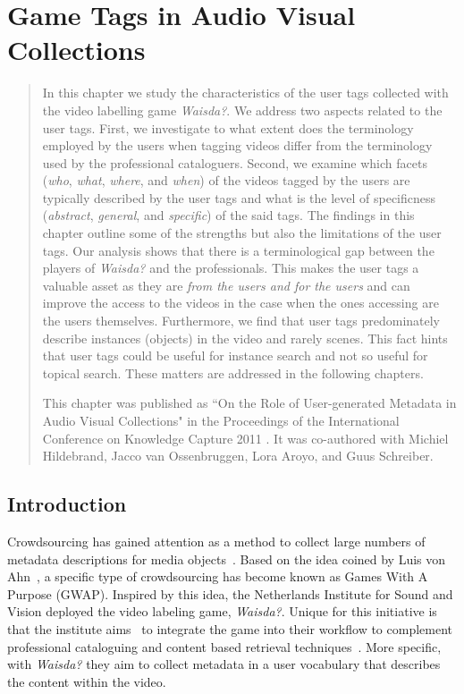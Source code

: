 \chapter{Game Tags in Audio Visual Collections}\label{chap:kcap}
\begin{quotation}
\noindent
In this chapter we study the characteristics of the user tags collected with the video labelling game \textit{Waisda?}. We address two aspects related to the user tags. First, we investigate to what extent does the terminology employed by the users when tagging videos differ from the terminology used by the professional cataloguers. Second, we examine which facets (\textit{who}, \textit{what}, \textit{where}, and \textit{when}) of the videos tagged by the users are typically described by the user tags and what is the level of specificness (\textit{abstract}, \textit{general}, and \textit{specific}) of the said tags. 
The findings in this chapter outline some of the strengths but also the limitations of the user tags. Our analysis shows that there is a terminological gap between the players of \textit{Waisda?} and the professionals. This makes the user tags a valuable asset as they are \textit{from the users and for the users} and can improve the access to the videos in the case when the ones accessing are the users themselves. Furthermore,  we find that user tags predominately describe instances (objects) in the video and rarely scenes. 
This fact hints that user tags could be useful for instance search and not so useful for topical search. These matters are addressed in the following chapters.

This chapter was published as ``On the Role of User-generated Metadata in Audio Visual Collections" in the Proceedings of the International Conference on Knowledge Capture 2011 \cite{kcap}. It was co-authored with Michiel Hildebrand, Jacco van Ossenbruggen, Lora Aroyo, and Guus Schreiber. 
\end{quotation}

\section{Introduction}

Crowdsourcing has gained attention as a method to collect large numbers of
metadata descriptions for media
objects~\cite{MATW2007:Chan,MATW2009:Leason,FlickrCommons}. Based on the idea
coined by Luis von Ahn~\cite{gwap}, a specific type of crowdsourcing has
become known as Games With A Purpose (GWAP). Inspired by this idea, the
Netherlands Institute for Sound and Vision deployed the video labeling game,
\emph{Waisda?}. Unique for this initiative is that the institute
aims~\cite{johanwebsci} to integrate the game into their workflow to
complement professional cataloguing and content based retrieval
techniques~\cite{ISR2009:hollink}. More specific, with \emph{Waisda?} they aim
to collect metadata in a user vocabulary that describes the content within the
video.

